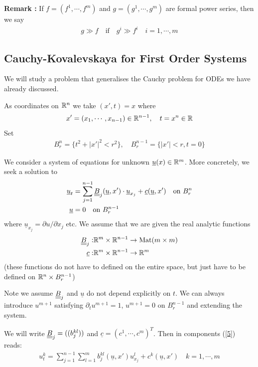 \documentclass[10pt,a4paper]{report}
\begin{document}
\textbf{Remark :} If $f = (f^1, \cdots, f^m)$ and $g =(g^1, \cdots, g^m)$ are formal power series, then we say
\begin{align*}
g\gg f \quad \text{if} \quad g^i \gg f^i \quad i=1,\cdots,m
\end{align*}
\s

\subsection*{Cauchy-Kovalevskaya for First Order Systems}
We will study a problem that generalises the Cauchy problem for ODEs we have already discussed.
\s

As coordinates on $\mathbb{R}^n$ we take $(x',t) = x$ where
\begin{align*}
x'=(x_1,\cdots,x_{n-1}) \in \mathbb{R}^{n-1}, \quad t=x^n \in \mathbb{R}
\end{align*}
Set
\begin{align*}
B^n_r = \{t^2 +|x'|^2 <r^2 \}, \quad B_r^{n-1} = \{|x'|<r, t=0 \}
\end{align*}
\s

\renewcommand{\vec}{\underline}
We consider a system of equations for unknown $\vec{u}(x) \in \reals^m$. More concretely, we seek a solution to
\begin{align} 
\vec{u}_t &= \sum_{j=1}^{n-1} \doubleunderline{B}_j (\vec{u},x') \cdot \vec{u}_{x_j} + \vec{c}(\vec{u},x') \quad \text{on } B_r^n \label{5} \\
\vec{u} &= 0 \quad \text{on } B_r^{n-1} \nonumber
\end{align}
where $\vec{u}_{x_j}=\partial u/\partial x_j$ etc. We assume that we are given the real analytic functions
\begin{align*}
\doubleunderline{B}_j :& \reals^m \times \reals^{n-1} \rightarrow \text{Mat}(m\times m) \\
\vec{c} :& \reals^m \times \reals^{n-1} \rightarrow \reals^m
\end{align*}
(these functions do not have to defined on the entire space, but just have to be defined on $\mathbb{R}^n \times B^{n-1}_r$)

Note we assume $\underline{\underline{B}}_j$ and $\vec{u}$ do not depend explicitly on $t$. We can always introduce $u^{m+1}$ satisfying $\partial_t u^{m+1} =1$, $u^{m+1} =0$ on $B_r^{n-1}$ and extending the system.

\quad We will write $\underline{\underline{B}}_j = ((b_j^{kl}))$ and $\vec{c}  = (c^1, \cdots, c^m)^T$. Then in components (\ref{5}) reads:
\begin{align*}
u_t^k = \sum_{j=1}^{n-1} \sum_{l=1}^m b_j^{kl}(\vec{u},x')u_{x_j}^l + c^k(\vec{u},x') \quad k=1,\cdots, m
\end{align*}
\s
\end{document}
